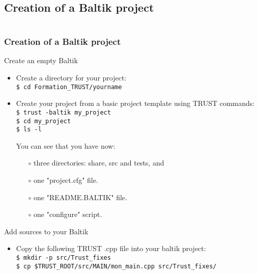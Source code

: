 \documentclass[10pt, hyperref={unicode=true,pdfusetitle, bookmarks=true,bookmarksnumbered=false,bookmarksopen=false, breaklinks=false,pdfborder={0 0 1},backref=true,colorlinks=true,linkcolor=darkblue,pageanchor, urlcolor=darkblue}]{beamer}
\begin{document}
\subsection{{\bf{Creation of a Baltik project}}}
\begin{frame}
\begin{columns}[c] 
\tableofcontents[sections={1-4},currentsection, currentsubsection]
\tableofcontents[sections={5-10},currentsection, currentsubsection]
\end{columns}
\end{frame}
\begin{frame}
\frametitle{Creation of a Baltik project}
\begin{block}{Create an empty Baltik}

\begin{itemize}
\item Create a directory for your project:\\
\texttt{\$ cd Formation\_TRUST/yourname}

\item Create your project from a basic project template using TRUST commands:\\
\texttt{\$ trust -baltik my\_project}\\
\texttt{\$ cd my\_project}\\

\texttt{\$ ls -l}

You can see that you have now:
    \begin{itemize}
    \item [$\circ$] three directories: share, src and tests, and
    \item [$\circ$] one "project.cfg" file.
    \item [$\circ$] one "README.BALTIK" file.
    \item [$\circ$] one "configure" script.
    \end{itemize}
    \end{itemize}    
\end{block}

\begin{block}{Add sources to your Baltik}
\begin{itemize}
\item Copy the following TRUST .cpp file into your baltik project:\\
\texttt{\$ mkdir -p src/Trust\_fixes} \\
\texttt{\$ cp \$TRUST\_ROOT/src/MAIN/mon\_main.cpp src/Trust\_fixes/}
\end{itemize}

\end{block}
\end{frame}
\end{document}
